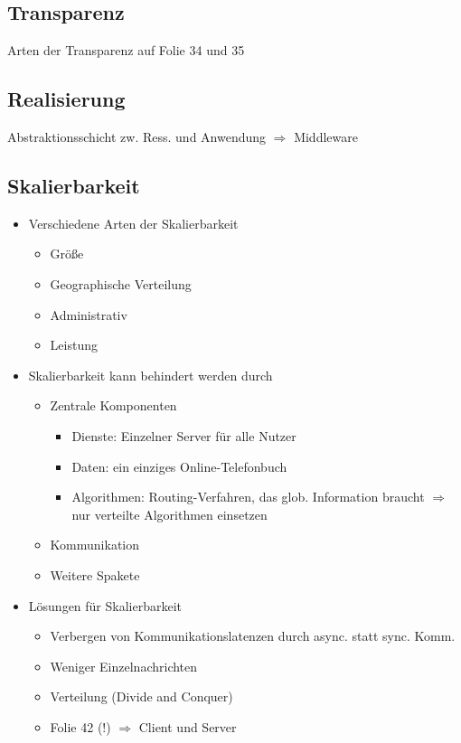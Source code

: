 \subsection{Transparenz}
Arten der Transparenz auf Folie 34 und 35

\subsection{Realisierung}
Abstraktionsschicht zw. Ress. und Anwendung $\Rightarrow$ Middleware

\subsection{Skalierbarkeit}

\begin{itemize}
	\item Verschiedene Arten der Skalierbarkeit
		\begin{itemize}
			\item Größe
			\item Geographische Verteilung
			\item Administrativ
			\item Leistung
		\end{itemize}
	\item Skalierbarkeit kann behindert werden durch
		\begin{itemize}
			\item Zentrale Komponenten
				\begin{itemize}
					\item Dienste: Einzelner Server für alle Nutzer
					\item Daten: ein einziges Online-Telefonbuch
					\item Algorithmen: Routing-Verfahren, das glob. Information braucht $\Rightarrow$ nur verteilte Algorithmen einsetzen
				\end{itemize}
			\item Kommunikation
			\item Weitere Spakete
		\end{itemize}
	\item Lösungen für Skalierbarkeit
		\begin{itemize}
			\item Verbergen von Kommunikationslatenzen durch async. statt sync. Komm.
			\item Weniger Einzelnachrichten
			\item Verteilung (Divide and Conquer)
			\item Folie 42 (!) $\Rightarrow$ Client und Server

\end{itemize}
\end{itemize}
